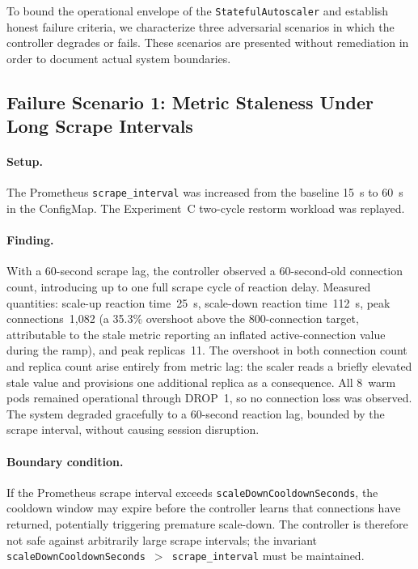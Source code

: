 \documentclass[twocolumn]{svjour3}
\begin{document}
To bound the operational envelope of the \texttt{StatefulAutoscaler} and establish honest failure criteria, we characterize three adversarial scenarios in which the controller degrades or fails. These scenarios are presented without remediation in order to document actual system boundaries.

\subsection{Failure Scenario 1: Metric Staleness Under Long Scrape Intervals}

\paragraph{Setup.} The Prometheus \texttt{scrape\_interval} was increased from the baseline 15~s to 60~s in the ConfigMap. The Experiment~C two-cycle restorm workload was replayed.

\paragraph{Finding.} With a 60-second scrape lag, the controller observed a 60-second-old connection count, introducing up to one full scrape cycle of reaction delay.  Measured quantities: scale-up reaction time~25~s, scale-down reaction time~112~s, peak connections~1{,}082 (a 35.3\% overshoot above the 800-connection target, attributable to the stale metric reporting an inflated active-connection value during the ramp), and peak replicas~11.  The overshoot in both connection count and replica count arise entirely from metric lag: the scaler reads a briefly elevated stale value and provisions one additional replica as a consequence.  All 8~warm pods remained operational through DROP~1, so no connection loss was observed.  The system degraded gracefully to a 60-second reaction lag, bounded by the scrape interval, without causing session disruption.

\paragraph{Boundary condition.} If the Prometheus scrape interval exceeds \texttt{scaleDownCooldownSeconds}, the cooldown window may expire before the controller learns that connections have returned, potentially triggering premature scale-down. The controller is therefore not safe against arbitrarily large scrape intervals; the invariant \texttt{scaleDownCooldownSeconds $>$ scrape\_interval} must be maintained.
\end{document}
